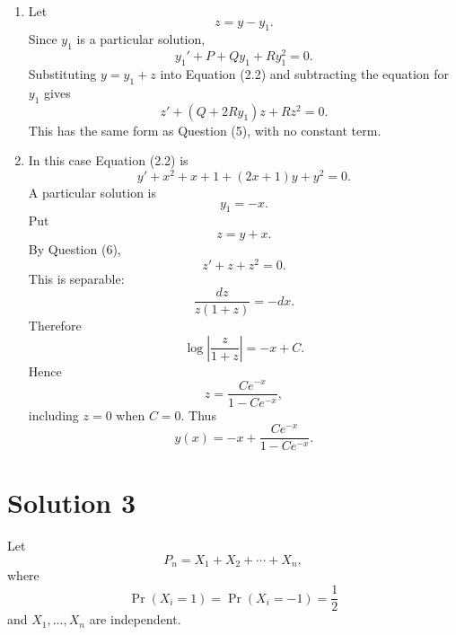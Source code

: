 \documentclass[10pt,a4paper]{article}
\begin{document}
\begin{enumerate}
  \item Let
        \[
          z=y-y_1.
        \]
        Since $y_1$ is a particular solution,
        \[
          y_1'+P+Qy_1+Ry_1^2=0.
        \]
        Substituting $y=y_1+z$ into Equation (2.2) and subtracting the equation for $y_1$ gives
        \[
          z'+(Q+2Ry_1)z+Rz^2=0.
        \]
        This has the same form as Question (5), with no constant term.

  \item In this case Equation (2.2) is
        \[
          y'+x^2+x+1+(2x+1)y+y^2=0.
        \]
        A particular solution is
        \[
          y_1=-x.
        \]
        Put
        \[
          z=y+x.
        \]
        By Question (6),
        \[
          z'+z+z^2=0.
        \]
        This is separable:
        \[
          \frac{dz}{z(1+z)}=-dx.
        \]
        Therefore
        \[
          \log\left|\frac{z}{1+z}\right|=-x+C.
        \]
        Hence
        \[
          z=\frac{Ce^{-x}}{1-Ce^{-x}},
        \]
        including $z=0$ when $C=0$. Thus
        \[
          \boxed{
          y(x)=-x+\frac{Ce^{-x}}{1-Ce^{-x}}.}
        \]
\end{enumerate}

\section*{Solution 3}

Let
\[
  P_n=X_1+X_2+\cdots+X_n,
\]
where
\[
  \Pr(X_i=1)=\Pr(X_i=-1)=\frac12
\]
and $X_1,\ldots,X_n$ are independent.
\end{document}
